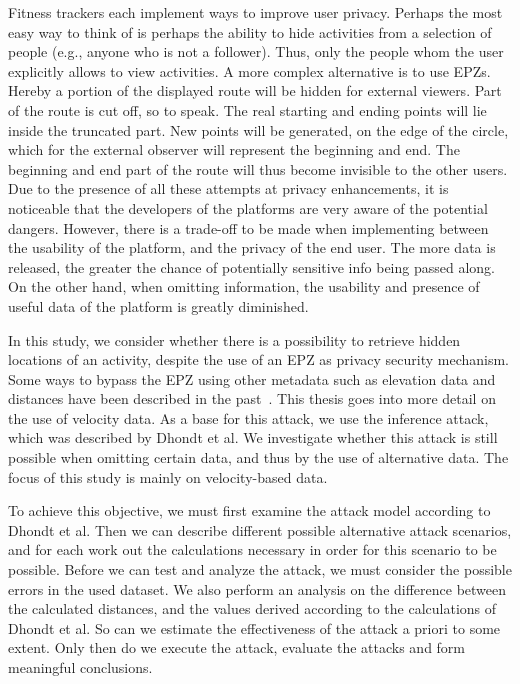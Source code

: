 \documentclass[conference]{IEEEtran}
\begin{document}
Fitness trackers each implement ways to improve user privacy. Perhaps the most
easy way to think of is perhaps the ability to hide activities from a selection
of people (e.g., anyone who is not a follower). Thus, only the people whom the
user explicitly allows to view activities. A more complex alternative is to use
EPZs. Hereby a portion of the displayed route will be hidden for external
viewers. Part of the route is cut off, so to speak. The real starting and
ending points will lie inside the truncated part. New points will be generated,
on the edge of the circle, which for the external observer will represent the
beginning and end. The beginning and end part of the route will thus become
invisible to the other users. Due to the presence of all these attempts at
privacy enhancements, it is noticeable that the developers of the platforms are
very aware of the potential dangers. However, there is a trade-off to be made
when implementing between the usability of the platform, and the privacy of the
end user. The more data is released, the greater the chance of potentially
sensitive info being passed along. On the other hand, when omitting
information, the usability and presence of useful data of the platform is
greatly diminished.

In this study, we consider whether there is a possibility to retrieve hidden
locations of an activity, despite the use of an EPZ as privacy security
mechanism. Some ways to bypass the EPZ using other metadata such as elevation
data and distances have been described in the past~\cite{Verdonck_2022, Dhondt,
    sec18has3:online}. This thesis goes into more detail on the use of velocity
data. As a base for this attack, we use the inference attack, which was
described by Dhondt et al. We investigate whether this attack is still possible
when omitting certain data, and thus by the use of alternative data. The focus
of this study is mainly on velocity-based data.

To achieve this objective, we must first examine the attack model according to
Dhondt et al. Then we can describe different possible alternative attack
scenarios, and for each work out the calculations necessary in order for this
scenario to be possible. Before we can test and analyze the attack, we must
consider the possible errors in the used dataset. We also perform an analysis
on the difference between the calculated distances, and the values derived
according to the calculations of Dhondt et al. So can we estimate the
effectiveness of the attack a priori to some extent. Only then do we execute
the attack, evaluate the attacks and form meaningful conclusions.
\end{document}
